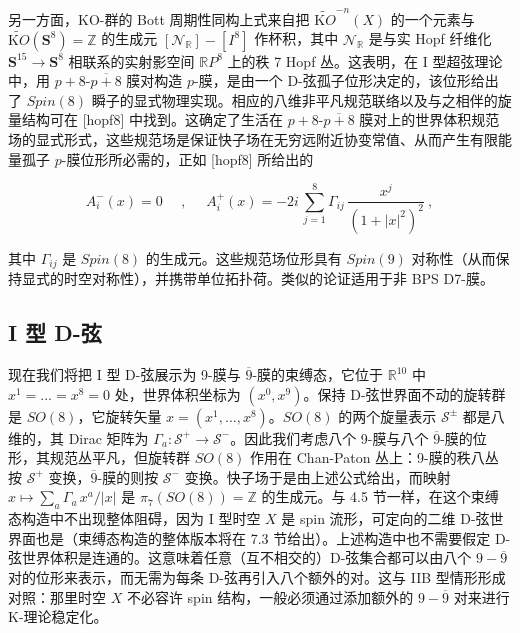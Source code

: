 \documentclass[11pt,a4paper]{ctexart}
\newcommand{\SrcRange}[2]{\marginpar{\raggedright\footnotesize 原文 p.#1}}
\begin{document}
另一方面，KO-群的 Bott 周期性同构上式来自把 \(\widetilde{{\mathrm KO}}^{-n}(X)\) 的一个元素与 \(\widetilde{{\mathrm KO}}({\mathbf S}^8)={\mathbb{Z}}\) 的生成元 \([{\mathcal N}_{{\mathbb{R}}}]-[I^8]\) 作杯积，其中 \({\mathcal N}_{\mathbb{R}}\) 是与实 Hopf 纤维化 \({\mathbf S}^{15}\rightarrow {\mathbf S}^8\) 相联系的实射影空间 \({\mathbb{R}} P^8\) 上的秩 7 Hopf 丛。这表明，在 I 型超弦理论中，用 \(p+8\)-\(\overline{p+8}\) 膜对构造 \(p\)-膜，是由一个 D-弦孤子位形决定的，该位形给出了 \(Spin(8)\) 瞬子的显式物理实现。相应的八维非平凡规范联络以及与之相伴的旋量结构可在 [hopf8] 中找到。这确定了生活在 \(p+8\)-\(\overline{p+8}\) 膜对上的世界体积规范场的显式形式，这些规范场是保证快子场在无穷远附近协变常值、从而产生有限能量孤子 \(p\)-膜位形所必需的，正如 [hopf8] 所给出的

\[A_i^-(x)=0~~~~~~,~~~~~~
A_i^+(x)=-2i\,\sum_{j=1}^8\Gamma_{ij}\,\frac{x^j}{(1+|x|^2)^2}\ ,\]

其中 \(\Gamma_{ij}\) 是 \(Spin(8)\) 的生成元。这些规范场位形具有 \(Spin(9)\) 对称性（从而保持显式的时空对称性），并携带单位拓扑荷。类似的论证适用于非 BPS D7-膜。

\SrcRange{60}{60}
\subsection{I 型 D-弦}\label{i-ux578b-d-ux5f26}

现在我们将把 I 型 D-弦展示为 9-膜与 \(\overline{9}\)-膜的束缚态，它位于 \({\mathbb{R}}^{10}\) 中 \(x^1=\ldots =x^8=0\) 处，世界体积坐标为 \((x^0,x^9)\)。保持 D-弦世界面不动的旋转群是 \(SO(8)\)，它旋转矢量 \(x=(x^1,\ldots, x^8)\)。\(SO(8)\) 的两个旋量表示 \({\mathcal S}^{\pm}\) 都是八维的，其 Dirac 矩阵为 \(\Gamma_a: {\mathcal S}^+\rightarrow {\mathcal S}^-\)。因此我们考虑八个 9-膜与八个 \(\overline{9}\)-膜的位形，其规范丛平凡，但旋转群 \(SO(8)\) 作用在 Chan-Paton 丛上：9-膜的秩八丛按 \({\mathcal S}^+\) 变换，\(\overline{9}\)-膜的则按 \({\mathcal S}^-\) 变换。快子场于是由上述公式给出，而映射 \(x\mapsto\sum_a\Gamma_a\,x^a/|x|\) 是 \(\pi_7(SO(8))={\mathbb{Z}}\) 的生成元。与 4.5 节一样，在这个束缚态构造中不出现整体阻碍，因为 I 型时空 \(X\) 是 spin 流形，可定向的二维 D-弦世界面也是（束缚态构造的整体版本将在 7.3 节给出）。上述构造中也不需要假定 D-弦世界体积是连通的。这意味着任意（互不相交的）D-弦集合都可以由八个 \(9-\overline{9}\) 对的位形来表示，而无需为每条 D-弦再引入八个额外的对。这与 IIB 型情形形成对照：那里时空 \(X\) 不必容许 spin 结构，一般必须通过添加额外的 \(9-\overline{9}\) 对来进行 K-理论稳定化。
\end{document}
